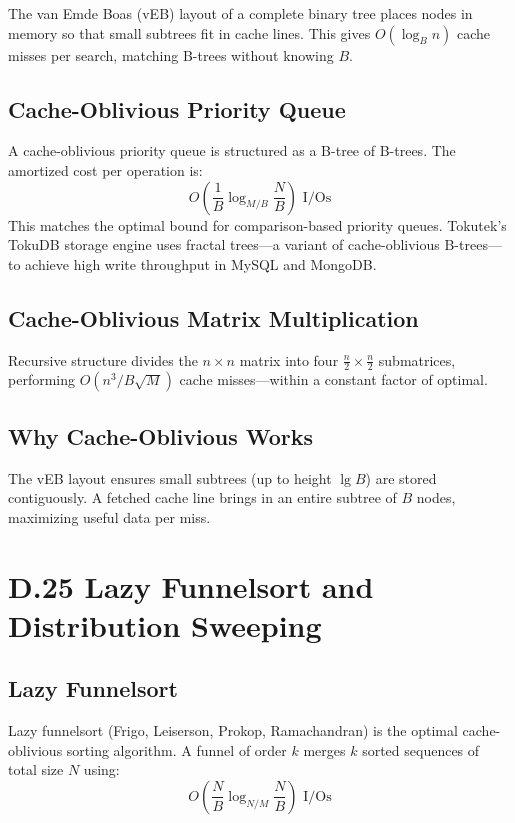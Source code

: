 The van Emde Boas (vEB) layout of a complete binary tree places nodes in memory so that small subtrees fit in cache lines. This gives $O(\log_B n)$ cache misses per search, matching B-trees without knowing $B$.

\subsection{Cache-Oblivious Priority Queue}

A cache-oblivious priority queue is structured as a B-tree of B-trees. The amortized cost per operation is:
\[
  O\!\left(\frac{1}{B} \log_{M/B} \frac{N}{B}\right) \text{ I/Os}
\]
This matches the optimal bound for comparison-based priority queues. Tokutek's TokuDB storage engine uses fractal trees---a variant of cache-oblivious B-trees---to achieve high write throughput in MySQL and MongoDB.

\subsection{Cache-Oblivious Matrix Multiplication}

Recursive structure divides the $n \times n$ matrix into four $\frac{n}{2} \times \frac{n}{2}$ submatrices, performing $O(n^3 / B\sqrt{M})$ cache misses---within a constant factor of optimal.

\subsection{Why Cache-Oblivious Works}

The vEB layout ensures small subtrees (up to height $\lg B$) are stored contiguously. A fetched cache line brings in an entire subtree of $B$ nodes, maximizing useful data per miss.

\section{D.25 Lazy Funnelsort and Distribution Sweeping}
\label{sec:funnelsort}

\subsection{Lazy Funnelsort}

Lazy funnelsort (Frigo, Leiserson, Prokop, Ramachandran) is the optimal cache-oblivious sorting algorithm. A funnel of order $k$ merges $k$ sorted sequences of total size $N$ using:
\[
  O\!\left(\frac{N}{B} \log_{N/M} \frac{N}{B}\right) \text{ I/Os}
\]

